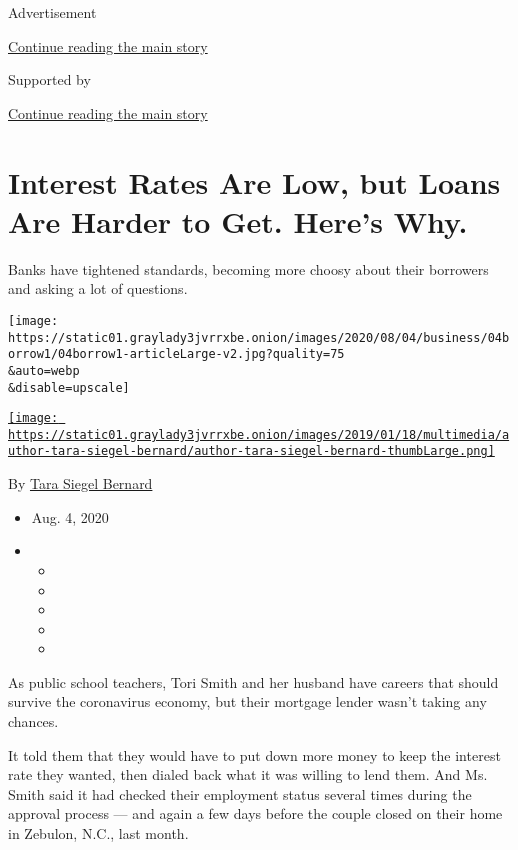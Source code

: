 Advertisement

\protect\hyperlink{after-top}{Continue reading the main story}

Supported by

\protect\hyperlink{after-sponsor}{Continue reading the main story}

\hypertarget{interest-rates-are-low-but-loans-are-harder-to-get-heres-why}{%
\section{Interest Rates Are Low, but Loans Are Harder to Get. Here's
Why.}\label{interest-rates-are-low-but-loans-are-harder-to-get-heres-why}}

Banks have tightened standards, becoming more choosy about their
borrowers and asking a lot of questions.

\texttt{[image: https://static01.graylady3jvrrxbe.onion/images/2020/08/04/business/04borrow1/04borrow1-articleLarge-v2.jpg?quality=75\\\&auto=webp\\\&disable=upscale]}

\href{https://www.nytimes3xbfgragh.onion/by/tara-siegel-bernard}{\texttt{[image: https://static01.graylady3jvrrxbe.onion/images/2019/01/18/multimedia/author-tara-siegel-bernard/author-tara-siegel-bernard-thumbLarge.png]}}

By \href{https://www.nytimes3xbfgragh.onion/by/tara-siegel-bernard}{Tara
Siegel Bernard}

\begin{itemize}
\item
  Aug. 4, 2020
\item
  \begin{itemize}
  \item
  \item
  \item
  \item
  \item
  \end{itemize}
\end{itemize}

As public school teachers, Tori Smith and her husband have careers that
should survive the coronavirus economy, but their mortgage lender wasn't
taking any chances.

It told them that they would have to put down more money to keep the
interest rate they wanted, then dialed back what it was willing to lend
them. And Ms. Smith said it had checked their employment status several
times during the approval process --- and again a few days before the
couple closed on their home in Zebulon, N.C., last month.

